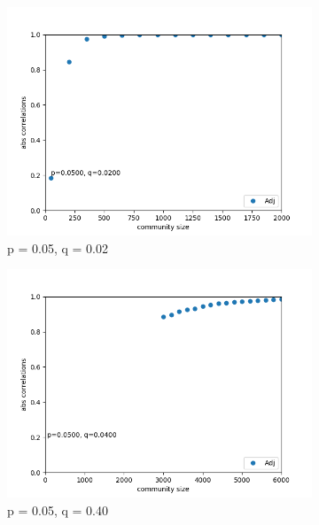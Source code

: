 \documentclass[finnish,12pt,a4paper,pdftex,sci,utf8]{aaltothesis}
\begin{document}
\begin{figure}
	\begin{subfigure}{0.3\textwidth}
		\centering
		\includegraphics[width=\textwidth]{figures/only_adj_1.png}
		\caption{p = 0.05, q = 0.02}
		\label{fig:o_adj_1}
	\end{subfigure}
	\begin{subfigure}{0.3\textwidth}
		\centering
		\includegraphics[width=\textwidth]{figures/only_adj_2.png}
		\caption{p = 0.05, q = 0.40}
	\end{subfigure}
	\begin{subfigure}{0.3\textwidth}
		\centering

\end{subfigure}
\end{figure}
\end{document}
